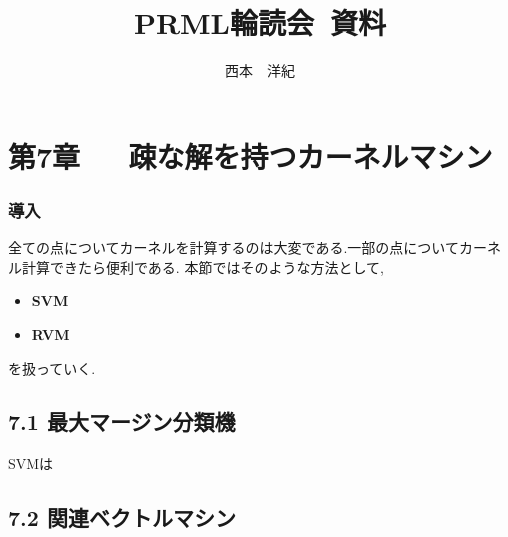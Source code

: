 \documentclass[11pt,a4paper]{jreport}
\begin{document}
\title{PRML輪読会~資料}
\author{西本　洋紀 }
\maketitle
\chapter*{第7章~~~疎な解を持つカーネルマシン}
\subsection*{導入}
全ての点についてカーネルを計算するのは大変である.一部の点についてカーネル計算できたら便利である. 本節ではそのような方法として,
\begin{itemize}
  \item \textbf{SVM}
  \item \textbf{RVM}
\end{itemize}
を扱っていく. \\
\section*{7.1 最大マージン分類機}
SVMは
\section*{7.2 関連ベクトルマシン}
\end{document}
